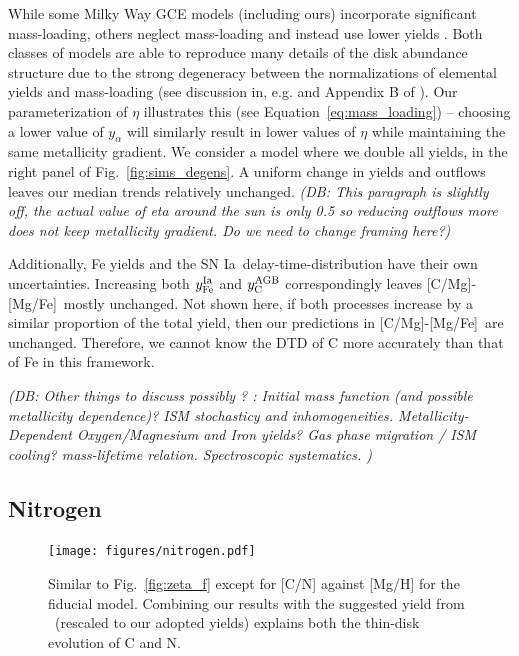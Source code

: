 \documentclass[fleqn,
usenatbib]{mnras}
\newcommand{\JJ}{\citetalias{james+21}}
\newcommand{\gce}{GCE}
\newcommand{\ia}{SN Ia}
\newcommand{\caafe}{[C/Mg]-[Mg/Fe]}
\newcommand{\Ycagb}{{y_{\rm C}^{\rm AGB}}}
\newcommand{\dbnote}[1]{ {\color{Thistle} \textit{\small (DB: #1)}} }
\begin{document}
While some Milky Way \gce{} models (including ours) incorporate significant mass-loading, others
neglect mass-loading and instead use lower yields \citep[e.g.][]{MCM13, MCM14, spitoni19, spitoni20, spitoni21}.
Both classes of models are able to reproduce many details of the disk abundance structure due to the strong degeneracy between the normalizations of elemental yields and mass-loading (see discussion in, e.g. \citealt{sandford+24} and Appendix B of \citealt{james+23}). 
Our parameterization of $\eta$ illustrates this (see Equation~\ref{eq:mass_loading}) -- choosing a lower value of $y_{\alpha}$ will similarly result in lower values of $\eta$ while maintaining the same metallicity gradient. 
We consider a model where we double all yields, in the right panel of Fig.~\ref{fig:sims_degens}. A uniform change in yields and outflows leaves our median trends relatively unchanged. 
\dbnote{This paragraph is slightly off, the actual value of eta around the sun is only 0.5 so reducing outflows more does not keep metallicity gradient. Do we need to change framing here?}


Additionally, Fe yields and the \ia\  delay-time-distribution have their own uncertainties. Increasing both $y_{\rm Fe}^{\rm Ia}$ and $\Ycagb$ correspondingly leaves \caafe\ mostly unchanged. Not shown here, if both processes increase by a similar proportion of the total yield, then our predictions in \caafe\ are unchanged. Therefore, we cannot know the DTD of C more accurately than that of Fe in this framework.

\dbnote{Other things to discuss possibly ? :
 Initial mass function (and possible metallicity dependence)? ISM stochasticy and inhomogeneities. Metallicity-Dependent Oxygen/Magnesium and Iron yields? Gas phase migration / ISM cooling?  mass-lifetime relation. Spectroscopic systematics.
 }


\subsection{Nitrogen}


\begin{figure}
\centering
\texttt{[image: figures/nitrogen.pdf]}

\caption[]{Similar to Fig.~\ref{fig:zeta_f} except for [C/N] against [Mg/H] for the fiducial model. Combining our results with the suggested yield from \JJ\ (rescaled to our adopted yields) explains both the thin-disk evolution of C and N. 
}
\label{fig:nitrogen}
\end{figure}
\end{document}
